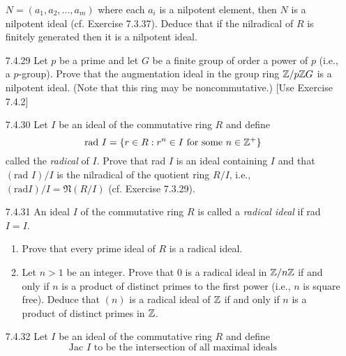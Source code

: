 \begin{enumerate}
                  $N = (a_1, a_2, \ldots, a_m)$ where each $a_i$ is a nilpotent
                  element, then $N$ is a nilpotent ideal (cf. Exercise 7.3.37).
                  Deduce that if the nilradical of $R$ is finitely generated
                  then it is a nilpotent ideal.
   \item[7.4.29]  Let $p$ be a prime and let $G$ be a finite group of order a
                  power of $p$ (i.e., a $p$-group). Prove that the augmentation
                  ideal in the group ring $\mathbb{Z}/p\mathbb{Z} G$ is a nilpotent ideal. (Note
                  that this ring may be noncommutative.) [Use Exercise 7.4.2]
   \item[7.4.30]  Let $I$ be an ideal of the commutative ring $R$ and define
                  $$\text{rad }I = \{r \in R : r^n \in I
                    \text{ for some }n \in \mathbb{Z}^+\}$$
                  called the \textit{radical} of $I$. Prove that rad $I$ is an
                  ideal containing $I$ and that $(\text{rad }I)/I$ is the
                  nilradical of the quotient ring $R/I$, i.e.,
                  $(\text{rad} I)/I = \mathfrak{N}(R/I)$ (cf. Exercise 7.3.29).
   \item[7.4.31]  An ideal $I$ of the commutative ring $R$ is called a
                  \textit{radical ideal} if rad $I = I$.
                  \begin{enumerate}
                     \item Prove that every prime ideal of $R$ is a radical
                           ideal.
                     \item Let $n > 1$ be an integer. Prove that 0 is a radical
                           ideal in $\mathbb{Z}/n\mathbb{Z}$ if and only if $n$ is a product of
                           distinct primes to the first power (i.e., $n$ is
                           square free). Deduce that $(n)$ is a radical ideal of
                           $\mathbb{Z}$ if and only if $n$ is a product of distinct
                           primes in $\mathbb{Z}$.
                  \end{enumerate}
   \item[7.4.32]  Let $I$ be an ideal of the commutative ring $R$ and define
                  $$\text{Jac $I$ to be the intersection of all maximal ideals
}$$
\end{enumerate}

